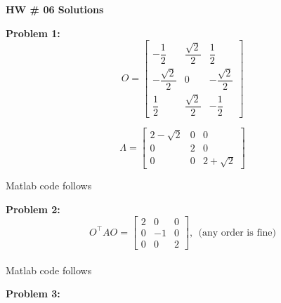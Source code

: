 \documentclass[letterpaper]{article}
\begin{document}
\newcommand{\trace}{\mathrm{trace}}
\newcommand{\real}{\mathbb R}  %
\newcommand{\nat}{\mathbb R}   %
\newcommand{\cp}{\mathbb C}    %
\newcommand{\ds}{\displaystyle}
\newcommand{\mf}[2]{\frac{\ds #1}{\ds #2}}
\newcommand{\book}[2]{{Luenberger, Page~#1, }{Prob.~#2}}
\newcommand{\spanof}[1]{\textrm{span} \{ #1 \}}
\parindent 0pt


\begin{center}
{\large \bf HW \# 06 Solutions}
\end{center}

\vspace*{1cm}

\noindent \textbf{Problem  1:}
$$O = \left[\begin{array}{ccc} 
-\dfrac{1}{2} & \dfrac{\sqrt{2}}{2} & \dfrac{1}{2} \\[2ex]
-\dfrac{\sqrt{2}}{2} & 0 & -\dfrac{\sqrt{2}}{2} \\[2ex]
\dfrac{1}{2} & \dfrac{\sqrt{2}}{2} & -\dfrac{1}{2}
\end{array}\right] $$

$$\Lambda = \left[\begin{array}{ccc} 
2-\sqrt{2} & 0 & 0 \\
0 & 2 & 0 \\
0 & 0 & 2+\sqrt{2}
\end{array}\right] $$

Matlab code follows


\noindent \textbf{Problem  2:}
$$O^\top A O = \left[\begin{array}{ccc} 
2 & 0 & 0 \\
0 & -1 & 0 \\
0 & 0 & 2
\end{array}\right],~~ \text{(any order is fine)} $$
\\
Matlab code follows


\noindent \textbf{Problem  3:}

\end{document}
